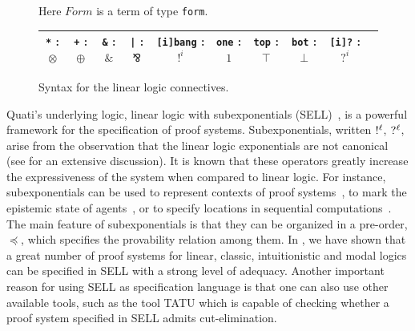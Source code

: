 \documentclass{llncs}
\newcommand{\tup}[1]{\langle#1\rangle}
\newcommand{\nbang}[1]{\hbox{$!^{#1}$}}
\newcommand{\nquest}[1]{\hbox{$?^{#1}$}}
\begin{document}
\begin{figure}[t]
{%
}
\vspace{-4mm}
\caption{Here $Form$ is a term of type \texttt{form}.} 
\label{fig:syntax}
\begin{center}
\begin{tabular}{c@{\quad}c@{\quad}c@{\quad}c@{\quad}c@{\quad}c@{\quad}c@{\quad}c@{\quad}c@{\quad}c}
\toprule
\texttt{*} : $\otimes$ & \texttt{+} : $\oplus$ & \texttt{\&} : $\&$ & \texttt{|} : $\bindnasrepma$ & \texttt{[i]bang} : $!^i$ &
\texttt{one} : $1$ &  \texttt{top} : $\top$ & \texttt{bot} : $\bot$ & \texttt{[i]?} : $?^i$ \\
\bottomrule
\end{tabular}
\end{center}
\vspace{-4mm}
\caption{Syntax for the linear logic connectives.}
\label{fig:syntax_ll}
\vspace{-4mm}
\end{figure}

Quati's underlying logic, linear logic with subexponentials
(SELL)~\cite{nigam09ppdp}, is a powerful framework for the specification of proof systems. 
Subexponentials, written $\nbang{\ell}$, $\nquest{\ell}$, arise from the
observation that the linear logic exponentials are not canonical (see
\cite{nigam.jlc} for an extensive discussion). It is known that these operators
greatly increase
the expressiveness of the system when compared to linear logic. For instance,
subexponentials can be used to represent contexts of proof
systems~\cite{nigam.jlc}, to mark the epistemic state of
agents~\cite{nigam12lics}, or to specify locations in sequential
computations~\cite{nigam09ppdp}. 
The main feature of subexponentials is that they can be organized in a pre-order, $\preceq$, which specifies
the provability relation among them. 
In \cite{nigam.jlc}, we have shown that a great number of proof systems for linear, classic, intuitionistic and 
modal logics can be specified in SELL with a strong level of adequacy. 
%
Another important reason for using SELL as specification language is that one can also use 
other available tools, such as the tool TATU which is capable of checking whether a proof system 
specified in SELL admits cut-elimination.
\end{document}
